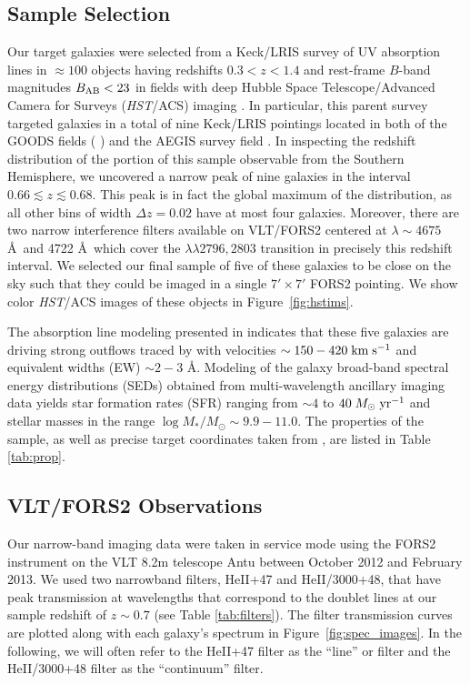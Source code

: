 \documentclass[twocolumn]{aastex62}
\def \mkms {{\rm \; km\;s^{-1}}}
\def \msunperyr {{\; M_{\odot}\rm \;yr^{-1}}}
\begin{document}
\subsection{Sample Selection}
Our target galaxies were selected from a Keck/LRIS survey of UV absorption lines in $\approx 100$ objects having redshifts $0.3< z < 1.4$ and rest-frame $B$-band magnitudes $B_{\rm AB}< 23$ in fields with deep Hubble Space Telescope/Advanced Camera for Surveys (\emph{HST}/ACS) imaging \citep{Rubin_2014}.  In particular, this parent survey targeted galaxies in a total of nine Keck/LRIS pointings located in both of the GOODS fields (\citeauthor{Giavalisco2004} \citeyear{Giavalisco2004}) and the AEGIS survey field \citep[the Extended Groth Strip;][]{Davis2007}.  In inspecting the redshift distribution of the portion of this sample observable from the Southern Hemisphere, we uncovered a narrow peak of nine galaxies in the interval $0.66 \lesssim z \lesssim 0.68$.  This peak is in fact the global maximum of the distribution, as all other bins of width $\Delta z = 0.02$ have at most four galaxies.  Moreover, there are two narrow interference filters available on VLT/FORS2 centered at $\lambda \sim 4675$ \AA\ and 4722 \AA\ which cover the  $\lambda \lambda 2796, 2803$ transition in precisely this redshift interval.  We selected our final sample of five of these galaxies %
to be close on the sky such that they could be imaged in a single $7' \times 7' $ FORS2 pointing.  
We show color {\it HST}/ACS images of these objects in Figure~\ref{fig:hstims}.

The absorption line modeling presented in \cite{Rubin_2014} indicates that these five galaxies are driving strong outflows traced by   with velocities $\sim150-420\mkms$ and equivalent widths (EW) $\sim 2-3$ \AA.  Modeling of the galaxy broad-band spectral energy distributions (SEDs) obtained from multi-wavelength ancillary imaging data yields star formation rates (SFR) ranging from $\sim4$ to $40\msunperyr$ and stellar masses in the range $\log M_*/M_{\odot}\sim 9.9-11.0$. The properties of the sample, as well as precise target coordinates taken from \cite{Rubin_2014}, are listed in Table \ref{tab:prop}. 


\subsection{VLT/FORS2 Observations}
Our narrow-band imaging data were taken in service mode using the FORS2 instrument on the VLT 8.2m telescope Antu between October 2012 and February 2013. 
We used two narrowband filters, HeII+47 and HeII/3000+48, that have peak transmission at wavelengths that correspond to the  doublet lines at our sample redshift of $z\sim0.7$ (see Table \ref{tab:filters}). The filter transmission curves are plotted along with each galaxy's spectrum in Figure~\ref{fig:spec_images}.
In the following, we will often refer to the HeII+47 filter as the ``line'' or  filter and the HeII/3000+48 filter as the ``continuum'' filter.
\end{document}
